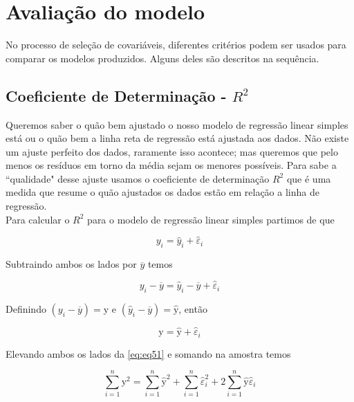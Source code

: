 \chapter{Avaliação do modelo}
\label{ch:avaliacao_do_modelo}

\noindent No processo de seleção de covariáveis, diferentes critérios podem ser
usados para comparar os modelos produzidos. Alguns deles são
descritos na sequência.

\section{Coeficiente de Determinação - \textit{$R^2$}}
\label{ch:r2}

\noindent Queremos saber o quão bem ajustado o nosso modelo de regressão linear simples está ou o quão bem a linha reta de regressão está ajustada aos dados. Não existe um ajuste perfeito dos dados, raramente isso acontece; mas queremos que pelo menos os resíduos em torno da média sejam os menores possíveis. Para sabe a ``qualidade" desse ajuste usamos o coeficiente de determinação $R^2$ que é uma medida que resume o quão ajustados os dados estão em relação a linha de regressão.\\

\noindent Para calcular o $R^2$ para o modelo de regressão linear simples partimos de que

\begin{equation}
    y_i = \hat{y}_i + \hat{\varepsilon}_i
\end{equation}

\noindent Subtraindo ambos os lados por $\overline{y}$ temos

\begin{equation}
    y_i - \overline{y} = \hat{y}_i - \overline{y} + \hat{\varepsilon}_i
\end{equation}

\noindent Definindo $(y_i - \overline{y}) = \text{y}$ e $(\hat{y}_i - \overline{y}) = \hat{\text{y}}$, então

\begin{equation}
    \label{eq:eq51}
    \text{y} = \hat{\text{y}} + \hat{\varepsilon}_i
\end{equation}


\noindent Elevando ambos os lados da \autoref{eq:eq51} e somando na amostra temos

\begin{equation}
    \sum_{i=1}^{n} \text{y}^2 = \sum_{i=1}^{n} \hat{\text{y}}^2 + \sum_{i=1}^{n} \hat{\varepsilon}_i^2 + 2 \sum_{i=1}^{n} \hat{\text{y}} \hat{\varepsilon}_i
\end{equation}

